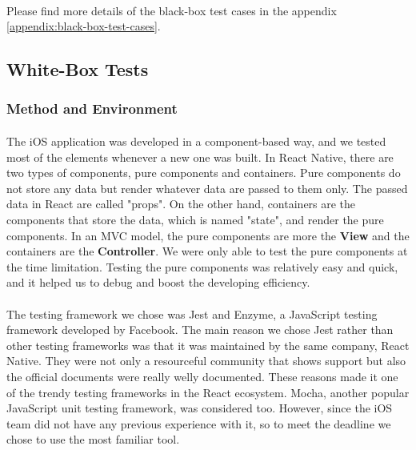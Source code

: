 \documentclass[12pt,a4paper]{article}
\begin{document}
          \paragraph{} Please find more details of the black-box test cases in the appendix \ref{appendix:black-box-test-cases}.

      \subsection{White-Box Tests}
        \subsubsection{Method and Environment} %
          \paragraph{}The iOS application was developed in a component-based way, and we tested most of the elements whenever a new one was built. In React Native, there are two types of components, pure components and containers. Pure components do not store any data but render whatever data are passed to them only. The passed data in React are called "props". On the other hand, containers are the components that store the data, which is named "state", and render the pure components. In an MVC model, the pure components are more the {\bf View} and the containers are the {\bf Controller}. We were only able to test the pure components at the time limitation. Testing the pure components was relatively easy and quick, and it helped us to debug and boost the developing efficiency.
          
          \paragraph{}The testing framework we chose was Jest\cite{Jest} and Enzyme\cite{Enzyme}, a JavaScript testing framework developed by Facebook. The main reason we chose Jest rather than other testing frameworks was that it was maintained by the same company, React Native. They were not only a resourceful community that shows support but also the official documents were really welly documented. These reasons made it one of the trendy testing frameworks in the React ecosystem. Mocha, another popular JavaScript unit testing framework, was considered too. However, since the iOS team did not have any previous experience with it, so to meet the deadline we chose to use the most familiar tool.
        
\end{document}
